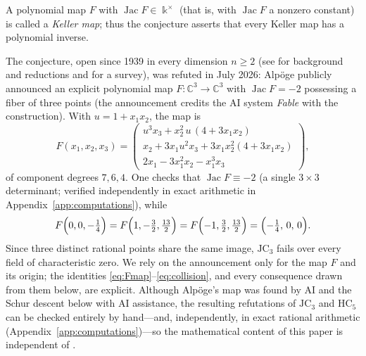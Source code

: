 \documentclass[11pt]{article}
\theoremstyle{plain}
\theoremstyle{definition}
\newcommand{\C}{\mathbb{C}}
\newcommand{\kk}{\Bbbk}
\newcommand{\JC}{\mathrm{JC}}
\newcommand{\HC}{\mathrm{HC}}
\newcommand{\Jac}{\operatorname{Jac}}
\begin{document}
\noindent A polynomial map $F$ with $\Jac F\in\kk^{\times}$ (that is,
with $\Jac F$ a nonzero constant) is called a \emph{Keller map}; thus the
conjecture asserts that every Keller map has a polynomial inverse.

The conjecture, open since 1939 in every dimension $n\ge2$ (see
\cite{BCW1982} for background and reductions and \cite{vandenEssen2000}
for a survey), was refuted in July 2026:
Alp\"oge publicly announced \cite{Alpoge2026} an explicit polynomial map
$F\colon\C^3\to\C^3$ with $\Jac F=-2$ possessing a fiber of three points
(the announcement credits the AI system \emph{Fable} with the
construction). With $u=1+x_1x_2$, the map is
\begin{equation}\label{eq:Fmap}
F(x_1,x_2,x_3)=
\begin{pmatrix}
u^3x_3+x_2^2\,u\,(4+3x_1x_2)\\[2pt]
x_2+3x_1u^2x_3+3x_1x_2^2(4+3x_1x_2)\\[2pt]
2x_1-3x_1^2x_2-x_1^3x_3
\end{pmatrix},
\end{equation}
of component degrees $7,6,4$. One checks that $\Jac F\equiv-2$ (a single
$3\times3$ determinant; verified independently in exact arithmetic in
Appendix~\ref{app:computations}), while
\begin{equation}\label{eq:collision}
F\Bigl(0,0,-\tfrac14\Bigr)
=F\Bigl(1,-\tfrac32,\tfrac{13}2\Bigr)
=F\Bigl(-1,\tfrac32,\tfrac{13}2\Bigr)
=\Bigl(-\tfrac14,\,0,\,0\Bigr).
\end{equation}
Since three distinct rational points share the same image, $\JC_3$
fails over every field of characteristic zero. We rely on the
announcement \cite{Alpoge2026} only for the map $F$ and its origin;
the identities \eqref{eq:Fmap}--\eqref{eq:collision}, and every
consequence drawn from them below, are explicit. Although Alp\"oge's map
was found by AI and the Schur descent below with AI assistance, the
resulting refutations of $\JC_3$ and $\HC_5$ can be checked entirely by
hand---and, independently, in exact rational arithmetic
(Appendix~\ref{app:computations})---so the mathematical content of this
paper is independent of \cite{Alpoge2026}.
\end{document}
